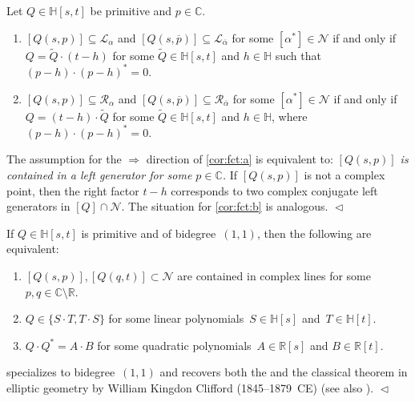 \documentclass[11pt]{article}
\newenvironment{claims}{\begin{enumerate}[topsep=0pt,itemsep=0pt,leftmargin=8mm,label=\textnormal{\textbf{(\alph*)}},ref=(\alph*)]}{\end{enumerate}}
\newcommand{\C}{\mathbb{C}}
\newcommand{\R}{\mathbb{R}}
\renewcommand{\H}{\mathbb{H}}
\newcommand{\cN}{\mathcal{N}}
\newcommand{\cL}{\mathcal{L}}
\newcommand{\cR}{\mathcal{R}}
\newcommand{\tQ}{\tilde{Q}}
\newcommand{\op}{{\overline{p}}}
\newcommand{\oalpha}{{\overline{\alpha}}}
\newcommand{\st}{such that }
\newcommand{\END}{\hfill $\vartriangleleft$}
\begin{document}
\begin{corollary}
\label{cor:fct}
Let $Q\in\H[s,t]$ be primitive and $p\in\C$.
\begin{claims}
\item\label{cor:fct:a}
$[Q(s,p)]\subseteq\cL_\alpha$
and
$[Q(s,\op)]\subseteq\cL_\oalpha$
for some $[\alpha^*]\in\cN$
if and only if
$Q=\tQ\cdot (t-h)$ for some $\tQ\in\H[s,t]$ and $h\in\H$
\st $(p-h)\cdot (p-h)^*=0$.

\item\label{cor:fct:b}
$[Q(s,p)]\subseteq\cR_\alpha$
and
$[Q(s,\op)]\subseteq\cR_\oalpha$
for some $[\alpha^*]\in\cN$
if and only if
$Q=(t-h)\cdot\tQ$ for some $\tQ\in\H[s,t]$ and $h\in\H$,
where $(p-h)\cdot (p-h)^*=0$.

\end{claims}
\end{corollary}

\begin{remark}
The assumption for the $\Rightarrow$ direction of \ref{cor:fct:a}
is equivalent to:
\textit{$[Q(s,p)]$ is contained in a left generator for some $p \in \C$.}
If $[Q(s,p)]$ is not a complex point, then the right factor $t-h$
corresponds to two complex conjugate left generators in $[Q]\cap\cN$.
The situation for \ref{cor:fct:b} is analogous.
\END
\end{remark}

\begin{corollary}
\label{cor:clifford}
If $Q\in\H[s,t]$ is primitive and of bidegree~$(1,1)$,
then the following are equivalent:
\begin{enumerate}[topsep=0pt,itemsep=2pt,label=(\roman*),ref=(\roman*)]
\item\label{i}
$[Q(s,p)], [Q(q,t)]\subset\cN$ are contained in complex lines for some $p,q\in\C\setminus\R$.
\item\label{ii}
$Q\in\{S\cdot T,T\cdot S\}$ for some linear polynomials~$S\in\H[s]$ and~$T\in\H[t]$.
\item\label{iii}
$Q\cdot Q^*=A\cdot B$ for some quadratic polynomials~$A\in\R[s]$ and $B\in\R[t]$.
\end{enumerate}
\end{corollary}

\begin{remark}
 specializes  to bidegree~$(1,1)$
and recovers both the \citep[Splitting Lemma~2.6]{2018sko}
and
the classical theorem \citep[7.94]{1998} in elliptic geometry by William Kingdon Clifford (1845--1879~CE)
(see also \citep[p.241]{1968}).
\END
\end{remark}
\end{document}
